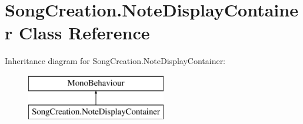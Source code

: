 \hypertarget{class_song_creation_1_1_note_display_container}{}\section{Song\+Creation.\+Note\+Display\+Container Class Reference}
\label{class_song_creation_1_1_note_display_container}
Inheritance diagram for Song\+Creation.\+Note\+Display\+Container\+:\begin{figure}[H]
\begin{center}
\leavevmode
\includegraphics[height=2.000000cm]{class_song_creation_1_1_note_display_container}
\end{center}
\end{figure}
